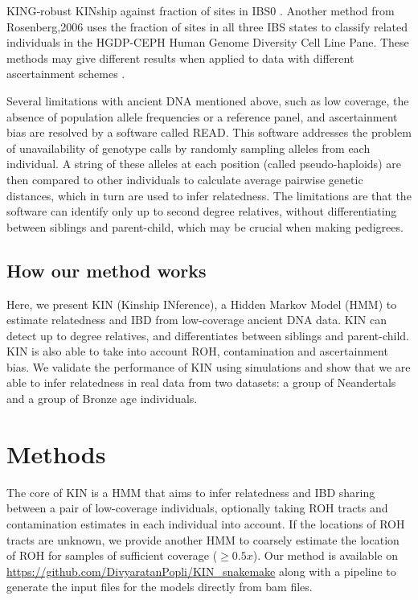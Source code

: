 \documentclass[12pt, letterpaper]{article}
\begin{document}
KING‐robust KINship against fraction of sites in IBS0 \cite{manichaikul_robust_2010}. Another method from Rosenberg,2006 \cite{rosenberg_standardized_2006} uses the fraction of sites in all three IBS states to classify related individuals in the HGDP-CEPH Human Genome Diversity Cell Line Pane. These methods may give different results when applied to data with different ascertainment schemes \cite{waples_allele_2019}. 

Several limitations with ancient DNA mentioned above, such as low coverage, the absence of population allele frequencies or a reference panel, and ascertainment bias are resolved by a software called READ. This software addresses the problem of unavailability of genotype calls by randomly sampling alleles from each individual. A string of these alleles at each position (called pseudo-haploids) are then compared to other individuals to calculate average pairwise genetic distances, which in turn are used to infer relatedness. The limitations are that the software can identify only up to second degree relatives, without differentiating between siblings and parent-child, which may be crucial when making pedigrees.

\subsection{How our method works}
Here, we present KIN (Kinship INference), a Hidden Markov Model (HMM) to estimate relatedness and IBD from low-coverage ancient DNA data. KIN can detect up to  degree relatives, and differentiates between siblings and parent-child. KIN is also able to take into account ROH, contamination and ascertainment bias. We validate the performance of KIN using simulations and show that we are able to infer relatedness in real data from two datasets: a group of Neandertals and a group of Bronze age individuals.


\section{Methods}

The core of  KIN is a HMM that aims to infer relatedness and IBD sharing between a pair of low-coverage individuals, optionally taking ROH tracts and contamination estimates in each individual into account. If the locations of ROH tracts are unknown, we provide another HMM to coarsely estimate the location of ROH for samples  of sufficient coverage ($\geq 0.5x$). Our method is available on \url{https://github.com/DivyaratanPopli/KIN_snakemake} along with a  \cite{koster_snakemakescalable_2012} pipeline to generate the input files for the models directly from bam files. 
\end{document}
